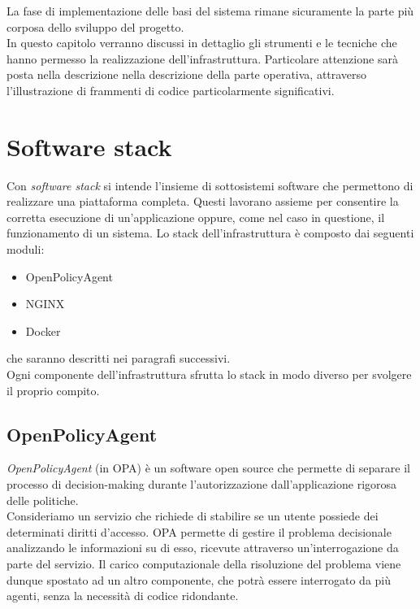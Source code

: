 La fase di implementazione delle basi del sistema rimane sicuramente la parte più corposa dello sviluppo del progetto.
\\ In questo capitolo verranno discussi in dettaglio gli strumenti e le tecniche
che hanno permesso la realizzazione dell'infrastruttura. Particolare attenzione sarà posta nella descrizione 
nella descrizione della parte operativa, attraverso l'illustrazione di frammenti di codice particolarmente significativi. 

\section{Software stack}
Con \textit{software stack} si intende l'insieme di sottosistemi software che permettono di realizzare una piattaforma completa.
Questi lavorano assieme per consentire la corretta esecuzione di un'applicazione oppure, come nel caso in questione, il 
funzionamento di un sistema.
Lo stack dell'infrastruttura è composto dai seguenti moduli:
\begin{itemize}
    \item OpenPolicyAgent
    \item NGINX
    \item Docker
\end{itemize}
che saranno descritti nei paragrafi successivi.
\\ Ogni componente dell'infrastruttura sfrutta lo stack in modo diverso per svolgere il proprio compito. 


\subsection{OpenPolicyAgent}
\textit{OpenPolicyAgent} (in OPA) è un software open source che permette di separare il processo di
 decision-making 
durante l'autorizzazione dall'applicazione rigorosa delle politiche.
\\ Consideriamo un servizio che richiede di stabilire se un utente possiede dei determinati diritti d'accesso.
OPA permette di gestire il problema decisionale analizzando le informazioni su di esso, ricevute attraverso un'interrogazione da parte del servizio. 
Il carico computazionale della risoluzione del problema viene dunque spostato ad un altro componente, che potrà essere interrogato da più 
agenti, senza la necessità di codice ridondante. 

